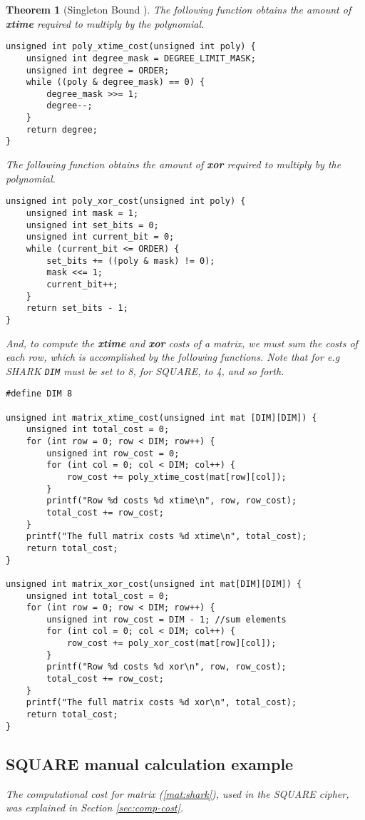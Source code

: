 \documentclass{report}
\newtheorem{theorem}{Theorem}{\bfseries}{\itshape}
\begin{document}
\begin{theorem}[Singleton Bound \cite{SloaneBook}]
The following function obtains the amount of \textbf{xtime} required to multiply by the polynomial.

\begin{verbatim}
unsigned int poly_xtime_cost(unsigned int poly) {
	unsigned int degree_mask = DEGREE_LIMIT_MASK;
	unsigned int degree = ORDER;
	while ((poly & degree_mask) == 0) {
		degree_mask >>= 1;
		degree--;
	}
	return degree;
}
\end{verbatim}

The following function obtains the amount of \textbf{xor} required to multiply by the polynomial.
\begin{verbatim}
unsigned int poly_xor_cost(unsigned int poly) {
	unsigned int mask = 1;
	unsigned int set_bits = 0;
	unsigned int current_bit = 0;
	while (current_bit <= ORDER) {
		set_bits += ((poly & mask) != 0);
		mask <<= 1;
		current_bit++;
	}
	return set_bits - 1;
}
\end{verbatim}

And, to compute the \textbf{xtime} and \textbf{xor} costs of a matrix, we must sum the costs of each row, which is accomplished by the following functions. Note that for e.g SHARK \texttt{DIM} must be set to 8, for SQUARE, to 4, and so forth.

\begin{verbatim}
#define DIM 8

unsigned int matrix_xtime_cost(unsigned int mat [DIM][DIM]) {
	unsigned int total_cost = 0;
	for (int row = 0; row < DIM; row++) {
		unsigned int row_cost = 0;
		for (int col = 0; col < DIM; col++) {
			row_cost += poly_xtime_cost(mat[row][col]);
		}
		printf("Row %d costs %d xtime\n", row, row_cost);
		total_cost += row_cost;
	}
	printf("The full matrix costs %d xtime\n", total_cost);
	return total_cost;
}

unsigned int matrix_xor_cost(unsigned int mat[DIM][DIM]) {
	unsigned int total_cost = 0;
	for (int row = 0; row < DIM; row++) {
		unsigned int row_cost = DIM - 1; //sum elements
		for (int col = 0; col < DIM; col++) {
			row_cost += poly_xor_cost(mat[row][col]);
		}
		printf("Row %d costs %d xor\n", row, row_cost);
		total_cost += row_cost;
	}
	printf("The full matrix costs %d xor\n", total_cost);
	return total_cost;
}
\end{verbatim}

\subsection{SQUARE manual calculation example}
The computational cost for matrix (\ref{mat:shark}), used in the SQUARE cipher, was explained in Section \ref{sec:comp-cost}.


\end{theorem}
\end{document}
